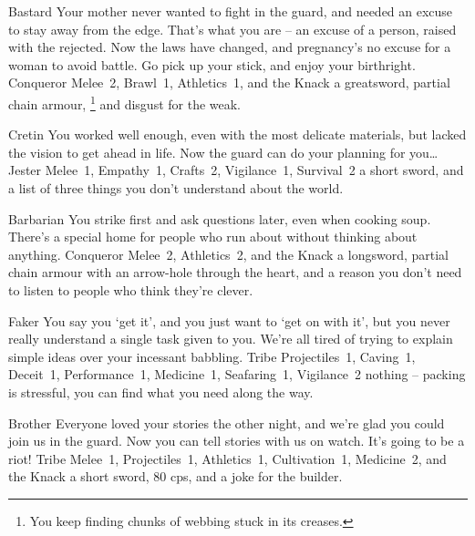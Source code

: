 \begin{multicols}{2}
\begin{itemize}

  {Bastard}%
  {Your mother never wanted to fight in the \gls{guard}, and needed an excuse to stay away from the \gls{edge}.
  That's what you are -- an excuse of a person, raised with the rejected.
  Now the laws have changed, and pregnancy's no excuse for a woman to avoid battle.
  Go pick up your stick, and enjoy your birthright.}%
  {Conqueror}%
  {Melee~2, Brawl~1, Athletics~1, and the Knack \adrenalinesurge}%
  {a greatsword, partial chain armour,%
  \footnote{You keep finding chunks of webbing stuck in its creases.}
  and disgust for the weak.}%

  {Cretin}%
  {You worked well enough, even with the most delicate materials, but lacked the vision to get ahead in life.
  Now the \gls{guard} can do your planning for you\ldots
  }%
  {Jester}%
  {Melee~1, Empathy~1, Crafts~2, Vigilance~1, Survival~2}%
  {a short sword, and a list of three things you don't understand about the world.}%


  {Barbarian}%
  {You strike first and ask questions later, even when cooking soup.
  There's a special home for people who run about without thinking about anything.
  }%
  {Conqueror}%
  {Melee~2, Athletics~2, and the Knack \laststand}%
  {a longsword, partial chain armour with an arrow-hole through the heart, and a reason you don't need to listen to people who think they're clever.}%


  {Faker}%
  {You say you `get it', and you just want to `get on with it', but you never really understand a single task given to you.
  We're all tired of trying to explain simple ideas over your incessant babbling.
  }%
  {Tribe}%
  {Projectiles~1, Caving~1, Deceit~1, Performance~1, Medicine~1, Seafaring~1, Vigilance~2}%
  {nothing -- packing is stressful, you can find what you need along the way.}%

  {Brother}%
  {Everyone loved your stories the other night, and we're glad you could join us in the \gls{guard}.
  Now you can tell stories with us on watch.
  It's going to be a riot!
  }%
  {Tribe}%
  {Melee~1, Projectiles~1, Athletics~1, Cultivation~1, Medicine~2, and the Knack \guardian}%
  {a short sword, 80 \glspl{cp}, and a joke for the builder.}%


\end{itemize}
\end{multicols}
